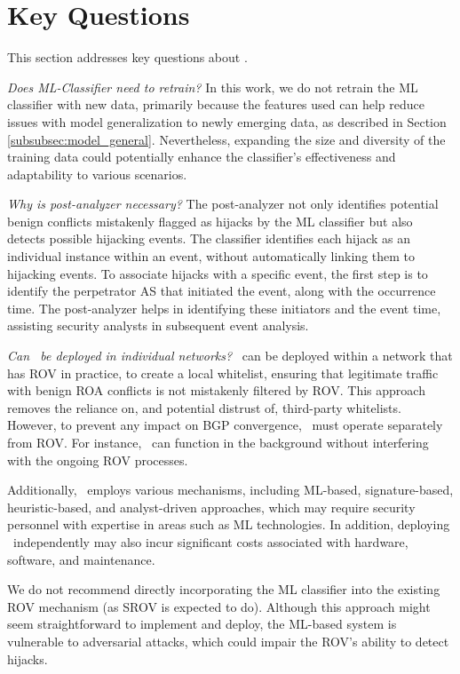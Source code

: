 \vspace{-5pt}
\section{Key Questions} \label{sec:questions}
This section addresses key questions about \lov.

\textit{Does ML-Classifier need to retrain?}
In this work, we do not retrain the ML classifier with new data, primarily because the features used can help reduce issues with model generalization to newly emerging data, as described in Section \ref{subsubsec:model_general}.
Nevertheless, expanding the size and diversity of the training data could potentially enhance the classifier's effectiveness and adaptability to various scenarios.

\textit{Why is post-analyzer necessary?}
The post-analyzer not only identifies potential benign conflicts mistakenly flagged as hijacks by the ML classifier but also detects possible hijacking events.
The classifier identifies each hijack as an individual instance within an event, without automatically linking them to hijacking events. To associate hijacks with a specific event, the first step is to identify the perpetrator AS that initiated the event, along with the occurrence time. The post-analyzer helps in identifying these initiators and the event time, assisting security analysts in subsequent event analysis.

\textit{Can \lov\ be deployed in individual networks?}
\lov\ can be deployed within a network that has ROV in practice, to create a local whitelist, ensuring that legitimate traffic with benign ROA conflicts is not mistakenly filtered by ROV. This approach removes the reliance on, and potential distrust of, third-party whitelists. However, to prevent any impact on BGP convergence, \lov\ must operate separately from ROV. For instance, \lov\ can function in the background without interfering with the ongoing ROV processes.

Additionally, \lov\ employs various mechanisms, including ML-based, signature-based, heuristic-based, and analyst-driven approaches, which may require security personnel with expertise in areas such as ML technologies. In addition, deploying \lov\ independently may also incur significant costs associated with hardware, software, and maintenance.

We do not recommend directly incorporating the ML classifier into the existing ROV mechanism (as SROV is expected to do). Although this approach might seem straightforward to implement and deploy, the ML-based system is vulnerable to adversarial attacks, which could impair the ROV's ability to detect hijacks.

